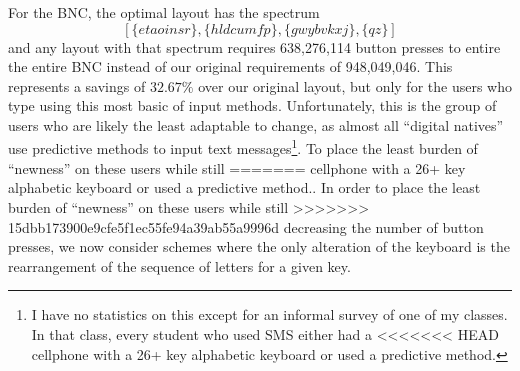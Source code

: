\documentclass[runningheads]{llncs}
\begin{document}
\begin{prob}[{\sc
MinimumKeystrokes}]
{For the BNC, the optimal layout has the spectrum $$[\{etaoinsr\}, \{hldcumfp\},
\{gwybvkxj\}, \{qz\}]$$ and any layout with that spectrum requires 638,276,114
button presses to entire the entire BNC instead of our original requirements of
948,049,046.  This represents a savings of $32.67\%$ over our original layout,
but only for the users who type using this most basic of input methods.
Unfortunately, this is the group of users who are likely the least adaptable to
change, as almost all ``digital natives'' use predictive methods to input text
messages\footnote{I have no statistics on this except for an informal survey of
one of my classes.  In that class, every student who used SMS either had a
<<<<<<< HEAD
cellphone with a 26+ key alphabetic keyboard or used a predictive method.}. 
To place the least burden of ``newness'' on these users while still
=======
cellphone with a 26+ key alphabetic keyboard or used a predictive method.}.  In
order to place the least burden of ``newness'' on these users while still
>>>>>>> 15dbb173900e9cfe5f1ec55fe94a39ab55a9996d
decreasing the number of button presses, we now consider schemes where the only
alteration of the keyboard is the rearrangement of the sequence of letters for
a given key.


\end{prob}
\end{document}
